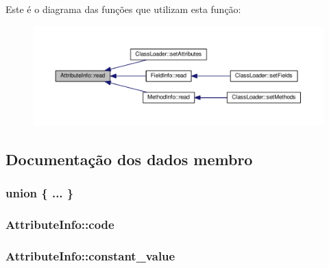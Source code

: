 Este é o diagrama das funções que utilizam esta função\+:
\nopagebreak
\begin{figure}[H]
\begin{center}
\leavevmode
\includegraphics[width=350pt]{class_attribute_info_ac167daa272a7ef9b9f11389d34e42165_icgraph}
\end{center}
\end{figure}




\subsection{Documentação dos dados membro}
\subsubsection[{\texorpdfstring{"@1}{@1}}]{\setlength{\rightskip}{0pt plus 5cm}union \{ ... \} }\hypertarget{class_attribute_info_ab35b46c1790d2b7441e934de8e718efb}{}\label{class_attribute_info_ab35b46c1790d2b7441e934de8e718efb}
\subsubsection[{\texorpdfstring{code}{code}}]{ Attribute\+Info\+::code}\hypertarget{class_attribute_info_a8402afa8032becfaf9feeb3ac48fd503}{}\label{class_attribute_info_a8402afa8032becfaf9feeb3ac48fd503}
\subsubsection[{\texorpdfstring{constant\+\_\+value}{constant_value}}]{ Attribute\+Info\+::constant\+\_\+value}\hypertarget{class_attribute_info_a250a7f39bbb2a2589dbf7bcdcf58639a}{}\label{class_attribute_info_a250a7f39bbb2a2589dbf7bcdcf58639a}
